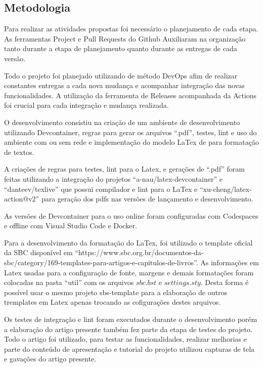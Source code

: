 \subsection{Metodologia}

Para realizar as atividades propostas foi necessário o planejamento de cada etapa. As ferramentas Project e Pull Requests do Github Auxiliaram na organização tanto durante a etapa de planejamento quanto durante as entregas de cada versão.

Todo o projeto foi planejado utilizando de método DevOps afim de realizar constantes entregas a cada nova mudança e acompanhar integração das novas funcionalidades. A utilização da ferramenta de Releases acompanhada da Actions foi crucial para cada integração e mudança realizada.

O desenvolvimento consistiu na criação de um ambiente de desenvolvimento utilizando Devcontainer, regras para gerar os arquivos ``.pdf'', testes, lint e uso do ambiente com ou sem rede e implementação do modelo LaTex de para formatação de textos.


A criações de regras para testes, lint para o Latex, e gerações de ``.pdf'' foram feitas utilizando a integração do projetos ``a-nau/latex-devcontainer'' e ``danteev/texlive'' que possui compilador e lint para o LaTex e ``xu-cheng/latex-action@v2'' para geração dos pdfs nas versões de lançamento e desenvolvimento.

As versões de Devcontainer para o uso online foram configuradas com Codespaces e offline com Visual Studio Code e Docker.

Para a desenvolvimento da formatação do LaTex, foi utilizado o template oficial da SBC disponível em ``https://www.sbc.org.br/documentos-da-sbc/category/169-templates-para-artigos-e-capitulos-de-livros''. As informações em Latex usadas para a configuração de fonte, margens e demais formatações foram colocadas na pasta ``util'' com os arquivos $sbc.bst$ e $settings.sty$. Desta forma é possível usar o mesmo projeto sbs-template para a elaboração de outros tremplates em Latex apenas trocando as cofigurações destes arquivos.

Os testes de integração e lint foram executados durante o desenvolvimento porém a elaboração do artigo presente também fez parte da etapa de testes do projeto. Todo o artigo foi utilizado, para testar as funcionalidades, realizar melhorias e parte do conteúdo de apresentação e tutorial do projeto utilizou capturas de tela e gavações do artigo presente.